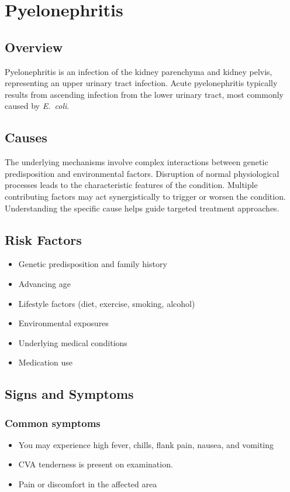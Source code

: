 \chapter{Pyelonephritis}
\label{sec:Pyelonephritis}

\section{Overview}
Pyelonephritis is an infection of the kidney parenchyma and kidney pelvis, representing an upper urinary tract infection. Acute pyelonephritis typically results from ascending infection from the lower urinary tract, most commonly caused by \textit{E.~coli}.
\section{Causes}
The underlying mechanisms involve complex interactions between genetic predisposition and environmental factors. Disruption of normal physiological processes leads to the characteristic features of the condition. Multiple contributing factors may act synergistically to trigger or worsen the condition. Understanding the specific cause helps guide targeted treatment approaches.
\section{Risk Factors}


\begin{itemize}[noitemsep]
  \item Genetic predisposition and family history
  \item Advancing age
  \item Lifestyle factors (diet, exercise, smoking, alcohol)
  \item Environmental exposures
  \item Underlying medical conditions
  \item Medication use
\end{itemize}
\section{Signs and Symptoms}

\subsection{Common symptoms}
\begin{itemize}[noitemsep]
  \item You may experience high fever, chills, flank pain, nausea, and vomiting
  \item CVA tenderness is present on examination.
  \item Pain or discomfort in the affected area
  \end{itemize}

